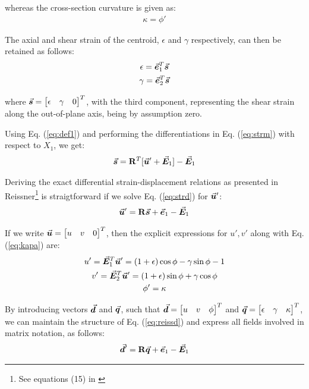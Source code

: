 \noindent whereas the cross-section curvature is given as:
\begin{gather}
	\kappa=\phi'
	\label{eq:kapa}
\end{gather}

\noindent The axial and shear strain of the centroid, $\epsilon$ and
$\gamma$ respectively, can then be retained as follows:
\begin{gather}
	\epsilon = \vec{\bm{e}}_1^T\vec{\bm{s}}\\
	\gamma = \vec{\bm{e}}_2^T\vec{\bm{s}}
\end{gather}

\noindent where $\vec{\bm{s}}=\begin{bmatrix}
	\epsilon & \gamma & 0
\end{bmatrix}^T$, with the third component, representing the shear strain along
the out-of-plane axis, being by assumption zero.

Using Eq. (\ref{eq:def1}) and performing the differentiations in
Eq. (\ref{eq:strm}) with respect to $X_1$, we get:
\begin{gather}
	\vec{\bm{s}} = \mathbf{R}^T[\vec{\bm{u}}'+\vec{\bm{E}}_1] - \vec{\bm{E}}_1
	\label{eq:strd}
\end{gather}

\noindent Deriving the exact differential strain-displacement relations as
presented in Reissner\footnote{See equations (15) in \cite{Reissner1}} is 
straigtforward if we solve Eq. (\ref{eq:strd}) for $\vec{\bm{u}}'$:
\begin{gather}
	\vec{\bm{u}}' = \mathbf{R}\vec{\bm{s}}+\vec{\bm{e}}_1-\vec{\bm{E}}_1
	\label{eq:reissd}
\end{gather}

\noindent If we write $\vec{\bm{u}} = \begin{bmatrix} u & v & 0
\end{bmatrix}^T$, then the explicit expressions for $u',v'$ along with
Eq. (\ref{eq:kapa}) are:
\begin{subequations}
	\begin{gather}
		u'= \vec{\bm{E}}_1^T\vec{\bm{u}}'=(1+\epsilon)\cos\phi-\gamma\sin\phi-1\\
		v'= \vec{\bm{E}}_2^T\vec{\bm{u}}'=(1+\epsilon)\sin\phi+\gamma\cos\phi\\
		\phi'=\kappa\label{eq:cond3}
	\end{gather}
\end{subequations}

\noindent By introducing vectors $\vec{\bm{d}}$ and $\vec{\bm{q}}$, such that $
\vec{\bm{d}} = \begin{bmatrix}
	u & v & \phi
\end{bmatrix}^T $ and $ \vec{\bm{q}} = \begin{bmatrix}
	\epsilon & \gamma & \kappa
\end{bmatrix}^T$, we can maintain the structure of Eq. (\ref{eq:reissd}) and
express all fields involved in matrix notation, as follows:
\begin{gather}
	\vec{\bm{d}}' = \mathbf{R}\vec{\bm{q}}+\vec{\bm{e}}_1-\vec{\bm{E}}_1
	\label{eq:mainsd}
\end{gather}

